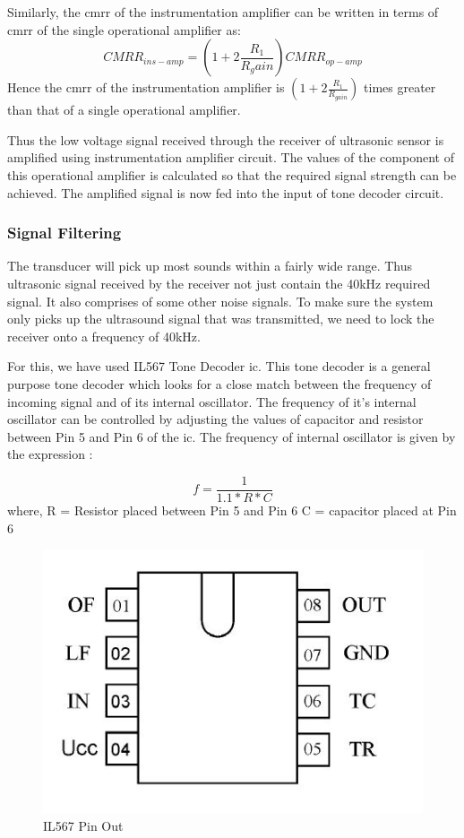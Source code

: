 Similarly, the \gls{cmrr} of the instrumentation amplifier can be written in terms of \gls{cmrr} of the single operational amplifier as:
\begin{equation}
	CMRR_{ins-amp}=(1+2\frac{R_1}{R_gain})CMRR_{op-amp} \nonumber
\end{equation}
Hence the \gls{cmrr} of the instrumentation amplifier is $(1+2\frac{R_1}{R_{gain}})$ times greater than that of a single operational amplifier.

	
Thus the low voltage signal received through the receiver of ultrasonic sensor is amplified using instrumentation amplifier circuit. The values of the component of this operational amplifier is calculated so that the required signal strength can be achieved. The amplified signal is now fed into the input of tone decoder circuit.


\subsubsection{Signal Filtering}

The transducer will pick up most sounds within a fairly wide range. Thus ultrasonic signal received by the receiver not just contain the 40kHz required signal. It also comprises of some other noise signals. To make sure the system only picks up the ultrasound signal that was transmitted, we need to lock the receiver onto a frequency of 40kHz. 

For this, we have used IL567 Tone Decoder \gls{ic}. This tone decoder is a general purpose tone decoder which looks for a close match between the frequency of incoming signal and of its internal oscillator. The frequency of it's internal oscillator can be controlled by adjusting the values of capacitor and resistor between Pin 5 and Pin 6 of the \gls{ic}. The frequency of internal oscillator is given by the expression :\cite{Yichao}

\begin{equation}
	f=\frac{1}{1.1*R*C}
\end{equation}
where,
R = Resistor placed between Pin 5 and Pin 6
C = capacitor placed at Pin 6
\begin{figure}[h]
	\centering
	\includegraphics[scale=0.5]{Images/IL567PinOut.jpg}
	\caption{IL567 Pin Out}
	\label{fig:PinOut}
\end{figure}

